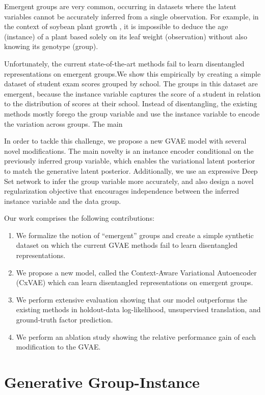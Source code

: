 \documentclass[nohyperref]{article}
\theoremstyle{plain}
\theoremstyle{definition}
\theoremstyle{remark}
\begin{document}
Emergent groups are very common, occurring in datasets where the latent variables cannot be accurately inferred from a single observation. For example, in the context of soybean plant growth \citep{Davidian1995NonlinearMF}, it is impossible to deduce the age (instance) of a plant based solely on its leaf weight (observation) without also knowing its genotype (group). 

Unfortunately,  the current state-of-the-art methods fail to learn disentangled representations on emergent groups.We show this empirically by creating a simple dataset of student exam scores grouped by school. The groups in this dataset are emergent, because the instance variable captures the score of a student in relation to the distribution of scores at their school. Instead of disentangling, the existing methods mostly forego the group variable and use the instance variable to encode the variation across groups. The main

In order to tackle this challenge, we propose a new GVAE model with several novel modifications. The main novelty is an instance encoder conditional on the previously inferred group variable, which enables the variational latent posterior to match the generative latent posterior.  Additionally, we use an expressive Deep Set network \citep{Zaheer2017DeepS} to infer the group variable more accurately, and also design a novel regularization objective that encourages independence between the inferred instance variable and the data group. 

Our work comprises the following contributions:
\begin{enumerate}
    \item We formalize the notion of ``emergent'' groups and create a simple synthetic dataset on which the current GVAE methods fail to learn disentangled representations.
    \item We propose a new model, called the Context-Aware Variational Autoencoder (CxVAE) which can learn disentangled representations on emergent groups.
    \item We perform extensive evaluation showing that our model outperforms the existing methods in holdout-data log-likelihood, unsupervised translation, and ground-truth factor prediction.
    \item We perform an ablation study showing the relative performance gain of each modification to the GVAE.
\end{enumerate}

\section{Generative Group-Instance}
\end{document}
